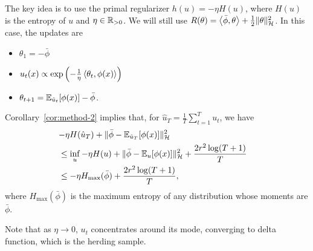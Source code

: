 \documentclass[paper.tex]{subfiles}
\begin{document}
The key idea is to use the primal regularizer $h(u) = -\eta H(u)$, where 
$H(u)$ is the entropy of $u$ and $\eta \in \mathbb{R}_{>0}$. We will still use 
$R(\theta) = \left\langle \bar{\phi}, \theta \right\rangle + \frac{1}{2} \|\theta\|_{\mathcal{H}}^2$.
In this case, the \dual updates are
\begin{itemize}
\item $\theta_1 = -\bar{\phi}$
\item $u_t(x) \propto \exp\left(-\frac{1}{\eta}\left\langle \theta_t, \phi(x) \right\rangle\right)$
\item $\theta_{t+1} = \mathbb{E}_{\hat{u}_t}[\phi(x)] - \bar\phi$.
\end{itemize}
Corollary~\ref{cor:method-2} implies that, for 
$\hat{u}_T = \frac{1}{T} \sum_{t=1}^T u_t$, we have
\begin{align*}
\lefteqn{-\eta H(\hat{u}_T) + \|\bar{\phi}-\bE_{\hat{u}_T}[\phi(x)]\|_{\sH}^2} \\
 &\leq \inf_{u} -\eta H(u) + \|\bar{\phi}-\bE_{u}[\phi(x)]\|_{\sH}^2 + \frac{2r^2\log(T+1)}{T} \\
 &\leq -\eta H_{\max}(\bar{\phi}) + \frac{2r^2\log(T+1)}{T},
\end{align*}
where $H_{\max}(\bar{\phi})$ is the maximum entropy of any distribution whose 
moments are $\bar{\phi}$.

Note that as $\eta \to 0$, $u_{t}$ concentrates around its mode, converging to delta function, which is the herding sample. 
\end{document}
